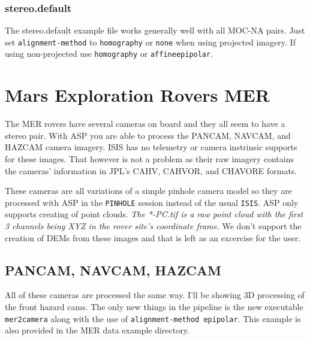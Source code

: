 \subsubsection*{stereo.default}

The stereo.default example file works generally well with all MOC-NA
pairs. Just set \texttt{alignment-method} to \texttt{homography} or
\texttt{none} when using projected imagery. If using non-projected use
\texttt{homography} or \texttt{affineepipolar}.

\newpage
\section{Mars Exploration Rovers MER}

The MER rovers have several cameras on board and they all seem to have
a stereo pair. With ASP you are able to process the PANCAM, NAVCAM,
and HAZCAM camera imagery. ISIS has no telemetry or camera instrinsic
supports for these images. That however is not a problem as their raw
imagery contains the cameras' information in JPL's CAHV, CAHVOR, and
CHAVORE formats.

These cameras are all variations of a simple pinhole camera model so
they are processed with ASP in the \texttt{PINHOLE} session instead of
the usual \texttt{ISIS}. ASP only supports creating of point
clouds. \emph{The *-PC.tif is a raw point cloud with the first 3
  channels being XYZ in the rover site's coordinate frame}. We don't
support the creation of DEMs from these images and that is left as an
excercise for the user.

\subsection{PANCAM, NAVCAM, HAZCAM}

All of these cameras are processed the same way. I'll be showing 3D
processing of the front hazard cams. The only new things in the
pipeline is the new executable \texttt{mer2camera} along with the use
of \texttt{alignment-method epipolar}. This example is also provided
in the MER data example directory.


